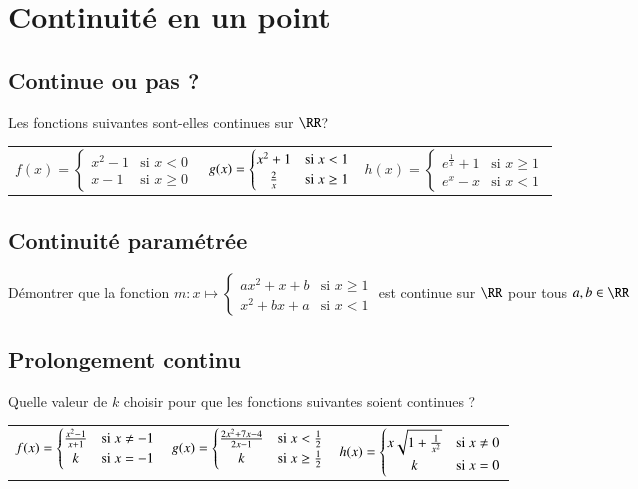 \documentclass[oneside,12pt]{article}          %
\begin{document}
\section{Continuité en un point}


\subsection{Continue ou pas ?}
Les fonctions suivantes sont-elles continues sur $\RR$?

\begin{tabular}{p{} p{} p{}}
    $f(x)=\begin{cases}
    		x^2-1 & \text{si } x<0 \\
    		x-1 & \text{si } x\geq0
    		\end{cases}$
    &
     $g(x)=\begin{cases}
     			x^2+1 & \text{si } x<1 \\
     			\hfil \frac{2}{x} & \text{si } x\geq1
     		\end{cases}$
    &
    $h(x)=\begin{cases}
    		e^{\frac{1}{x}}+1 & \text{si } x\geq1\\
    		e^x-x & \text{si } x<1
    		\end{cases}$
\end{tabular}



\subsection{Continuité paramétrée}
Démontrer que la fonction $m:x\mapsto\begin{cases}ax^2+x+b & \text{si } x\geq1\\x^2+bx+a & \text{si } x<1\end{cases}$ est continue sur $\RR$ pour tous $a,b\in\RR$



\subsection{Prolongement continu}
Quelle valeur de $k$ choisir pour que les fonctions suivantes soient continues ?

\begin{tabular}{p{} p{} p{}}
    $f(x)=\begin{cases}
    		\frac{x^2-1}{x+1} & \text{si } x\neq-1 \\ 
    		\hfil k & \text{si } x=-1
    		\end{cases}$
    &
    $g(x)=\begin{cases}
    		\frac{2x^2+7x-4}{2x-1} & \text{si } x<\frac{1}{2} \\
    		\hfil k & \text{si } x\geq\frac{1}{2}
    		\end{cases}$
    &
    $h(x)=\begin{cases}
    		x\sqrt{1+\frac{1}{x^2}} & \text{si }x\neq0 \\
    		\hfil k & \text{si } x=0
    		\end{cases}$
\end{tabular}
\end{document}
